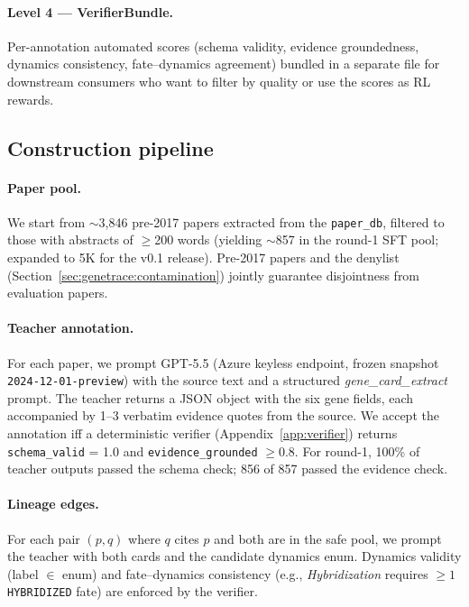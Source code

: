 \paragraph{Level 4 --- VerifierBundle.} Per-annotation automated scores
(schema validity, evidence groundedness, dynamics consistency,
fate--dynamics agreement) bundled in a separate file for downstream
consumers who want to filter by quality or use the scores as RL rewards.

\subsection{Construction pipeline}
\label{sec:genetrace:construction}

\paragraph{Paper pool.} We start from $\sim$3,846 pre-2017 papers extracted
from the \ideaevolving{} \texttt{paper\_db}, filtered to those with
abstracts of $\geq$200 words (yielding $\sim$857 in the round-1 SFT pool;
expanded to 5K for the v0.1 release). Pre-2017 papers and the
\ideaevolving{} denylist (Section~\ref{sec:genetrace:contamination}) jointly
guarantee disjointness from \geneexam{} evaluation papers.

\paragraph{Teacher annotation.} For each paper, we prompt GPT-5.5 (Azure
keyless endpoint, frozen snapshot \texttt{2024-12-01-preview}) with the
source text and a structured \emph{gene\_card\_extract} prompt. The teacher
returns a JSON object with the six gene fields, each accompanied by 1--3
verbatim evidence quotes from the source. We accept the annotation iff a
deterministic verifier (Appendix~\ref{app:verifier}) returns
\texttt{schema\_valid} = 1.0 and \texttt{evidence\_grounded} $\geq 0.8$.
For round-1, 100\% of teacher outputs passed the schema check; 856 of 857
passed the evidence check.

\paragraph{Lineage edges.} For each pair $(p, q)$ where $q$ cites $p$ and
both are in the safe pool, we prompt the teacher with both cards and the
candidate dynamics enum. Dynamics validity (label $\in$ enum) and
fate--dynamics consistency (e.g., \textit{Hybridization} requires $\geq 1$
\texttt{HYBRIDIZED} fate) are enforced by the verifier.

